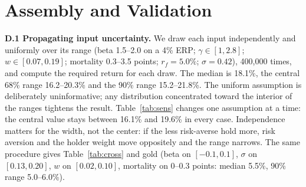 \documentclass[11pt]{article}
\begin{document}
\section{Assembly and Validation}

\textbf{D.1 Propagating input uncertainty.} We draw each input independently and uniformly over its range (beta 1.5--2.0 on a 4\% ERP; $\gamma \in [1, 2.8]$; $w \in [0.07, 0.19]$; mortality 0.3--3.5 points; $r_f = 5.0\%$; $\sigma = 0.42$), 400,000 times, and compute the required return for each draw. The median is 18.1\%, the central 68\% range 16.2--20.3\% and the 90\% range 15.2--21.8\%. The uniform assumption is deliberately uninformative; any distribution concentrated toward the interior of the ranges tightens the result. Table~\ref{tab:sens} changes one assumption at a time: the central value stays between 16.1\% and 19.6\% in every case. Independence matters for the width, not the center: if the less risk-averse hold more, risk aversion and the holder weight move oppositely and the range narrows. The same procedure gives Table~\ref{tab:cross} and gold (beta on $[-0.1, 0.1]$, $\sigma$ on $[0.13, 0.20]$, $w$ on $[0.02, 0.10]$, mortality on 0--0.3 points: median 5.5\%, 90\% range 5.0--6.0\%).
\end{document}
